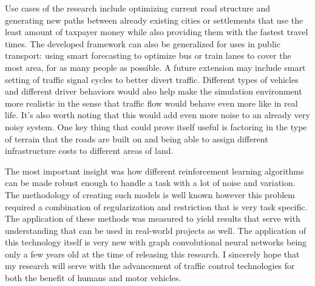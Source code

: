 \documentclass[
]{elteikthesis}[2023/04/10]
\begin{document}
Use cases of the research include optimizing current road structure
and generating new paths between already existing cities or settlements
that use the least amount of taxpayer money while also providing them
with the fastest travel times. The developed framework can also be
generalized for uses in public transport: using smart forecasting
to optimize bus or train lanes to cover the most area, for as many
people as possible. A future extension may include smart setting of
traffic signal cycles to better divert traffic. Different types of
vehicles and different driver behaviors would also help make the simulation
environment more realistic in the sense that traffic flow would behave
even more like in real life. It's also worth noting that this would
add even more noise to an already very noisy system. One key thing
that could prove itself useful is factoring in the type of terrain
that the roads are built on and being able to assign different infrastructure
costs to different areas of land.

The most important insight was how different reinforcement learning
algorithms can be made robust enough to handle a task with a lot of
noise and variation. The methodology of creating such models is well
known however this problem required a combination of regularization
and restriction that is very task specific. The application of these
methods was measured to yield results that serve with understanding
that can be used in real-world projects as well. The application of
this technology itself is very new with graph convolutional neural
networks being only a few years old at the time of releasing this
research. I sincerely hope that my research will serve with the advancement
of traffic control technologies for both the benefit of humans and
motor vehicles.

\newpage{}

\printbibliography

\listoffigures

\listoftables
\end{document}
